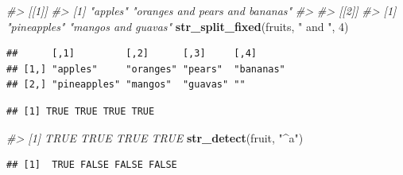 \documentclass[10pt,]{krantz}
\makeatletter
\newenvironment{Shaded}{\begin{snugshade}}{\end{snugshade}}
\newcommand{\KeywordTok}[1]{\textcolor[rgb]{0.13,0.29,0.53}{\textbf{#1}}}
\newcommand{\DecValTok}[1]{\textcolor[rgb]{0.00,0.00,0.81}{#1}}
\newcommand{\StringTok}[1]{\textcolor[rgb]{0.31,0.60,0.02}{#1}}
\newcommand{\CommentTok}[1]{\textcolor[rgb]{0.56,0.35,0.01}{\textit{#1}}}
\newcommand{\NormalTok}[1]{#1}
\newenvironment{kframe}{%
\medskip{}
\setlength{\fboxsep}{.8em}
 \def\at@end@of@kframe{}%
 \ifinner\ifhmode%
  \def\at@end@of@kframe{\end{minipage}}%
  \begin{minipage}{\columnwidth}%
 \fi\fi%
 \def\FrameCommand##1{\hskip\@totalleftmargin \hskip-\fboxsep
 \colorbox{shadecolor}{##1}\hskip-\fboxsep
     \hskip-\linewidth \hskip-\@totalleftmargin \hskip\columnwidth}%
 \MakeFramed {\advance\hsize-\width
   \@totalleftmargin\z@ \linewidth\hsize
   \@setminipage}}%
 {\par\unskip\endMakeFramed%
 \at@end@of@kframe}
\renewenvironment{Shaded}{\begin{kframe}}{\end{kframe}}
\makeatother
\begin{document}
\begin{Shaded}
\begin{Highlighting}[]
\CommentTok{#> [[1]]}
\CommentTok{#> [1] "apples"                        "oranges and pears and bananas"}
\CommentTok{#> }
\CommentTok{#> [[2]]}
\CommentTok{#> [1] "pineapples"        "mangos and guavas"}
\KeywordTok{str_split_fixed}\NormalTok{(fruits, }\StringTok{" and "}\NormalTok{, }\DecValTok{4}\NormalTok{)}
\end{Highlighting}
\end{Shaded}

\begin{verbatim}
##      [,1]         [,2]      [,3]     [,4]     
## [1,] "apples"     "oranges" "pears"  "bananas"
## [2,] "pineapples" "mangos"  "guavas" ""
\end{verbatim}

\begin{Shaded}
\end{Shaded}

\begin{verbatim}
## [1] TRUE TRUE TRUE TRUE
\end{verbatim}

\begin{Shaded}
\begin{Highlighting}[]
\CommentTok{#> [1] TRUE TRUE TRUE TRUE}
\KeywordTok{str_detect}\NormalTok{(fruit, }\StringTok{"^a"}\NormalTok{)}
\end{Highlighting}
\end{Shaded}

\begin{verbatim}
## [1]  TRUE FALSE FALSE FALSE
\end{verbatim}

\begin{Shaded}
\end{Shaded}
\end{document}
